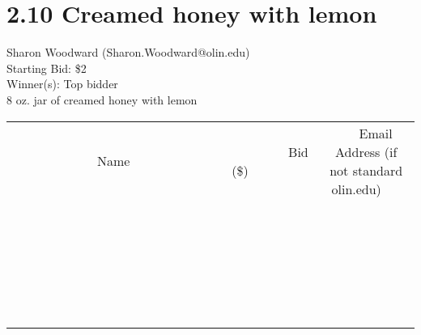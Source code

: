 \documentclass[11pt]{article}
\begin{document}
\section*{2.10 Creamed honey with lemon}
Sharon Woodward (Sharon.Woodward@olin.edu) \\
Starting Bid: \$2 \\
Winner(s): 
Top bidder \\
8 oz. jar of creamed honey with lemon \\[6ex]
\begin{tabular}{c c c}
~~~~~~~~~~~~~Name~~~~~~~~~~~~~ & ~~~~~~~~~Bid (\$)~~~~~~~~~ & ~~~Email Address (if not standard olin.edu)~~~ \\
 & & \\
\hline
 & & \\
\hline
 & & \\
\hline
 & & \\
\hline
 & & \\
\hline
 & & \\
\hline
 & & \\
\hline
 & & \\
\hline
 & & \\
\hline
 & & \\
\hline
 & & \\
\hline
 & & \\
\hline
 & & \\
\hline
 & & \\
\hline
 & & \\
\hline
 & & \\
\hline
 & & \\
\hline
 & & \\
\hline
 & & \\
\hline
 & & \\
\hline
 & & \\
\hline
 & & \\
\hline
 & & \\
\hline
 & & \\
\hline
 & & \\
\hline
 & & \\
\hline
\end{tabular}
\clearpage
\end{document}
